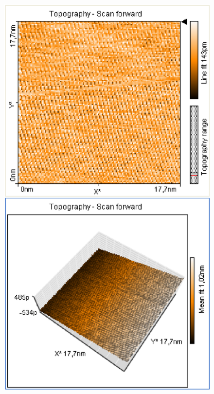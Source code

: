\documentclass[12pt]{article}
\begin{document}
\begin{figure}[H]
\begin{minipage}{0.4\linewidth}
\centering
\includegraphics[width=0.9\linewidth]{../plot/data/graphit/graphit2.eps}
\end{minipage}
\end{figure}
\end{document}
